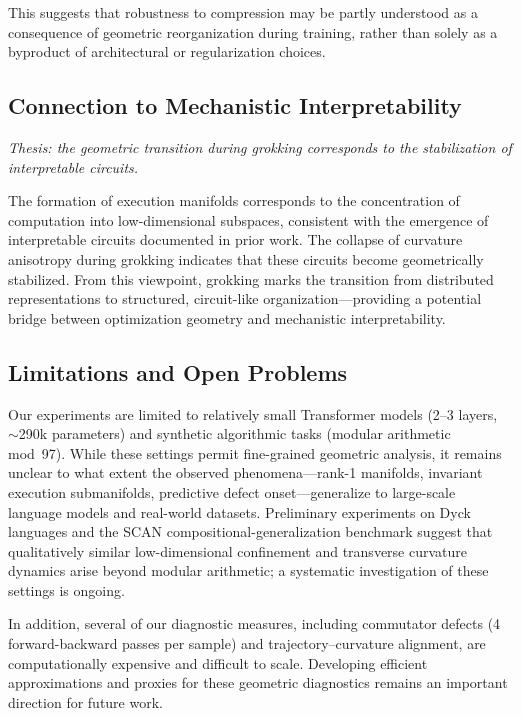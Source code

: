 \documentclass[11pt]{article}
\begin{document}
This suggests that robustness to compression may be partly understood as a consequence of geometric reorganization during training, rather than solely as a byproduct of architectural or regularization choices.

\subsection{Connection to Mechanistic Interpretability}
\label{sec:disc_interpretability}

\emph{Thesis: the geometric transition during grokking corresponds to the stabilization of interpretable circuits.}

The formation of execution manifolds corresponds to the concentration of computation into low-dimensional subspaces, consistent with the emergence of interpretable circuits documented in prior work.
The collapse of curvature anisotropy during grokking indicates that these circuits become geometrically stabilized.
From this viewpoint, grokking marks the transition from distributed representations to structured, circuit-like organization---providing a potential bridge between optimization geometry and mechanistic interpretability.

\subsection{Limitations and Open Problems}
\label{sec:disc_limitations}

Our experiments are limited to relatively small Transformer models (2--3 layers, $\sim$290k parameters) and synthetic algorithmic tasks (modular arithmetic mod~97).
While these settings permit fine-grained geometric analysis, it remains unclear to what extent the observed phenomena---rank-1 manifolds, invariant execution submanifolds, predictive defect onset---generalize to large-scale language models and real-world datasets.
Preliminary experiments on Dyck languages and the SCAN compositional-generalization benchmark suggest that qualitatively similar low-dimensional confinement and transverse curvature dynamics arise beyond modular arithmetic; a systematic investigation of these settings is ongoing.

In addition, several of our diagnostic measures, including commutator defects (4 forward-backward passes per sample) and trajectory--curvature alignment, are computationally expensive and difficult to scale.
Developing efficient approximations and proxies for these geometric diagnostics remains an important direction for future work.
\end{document}
